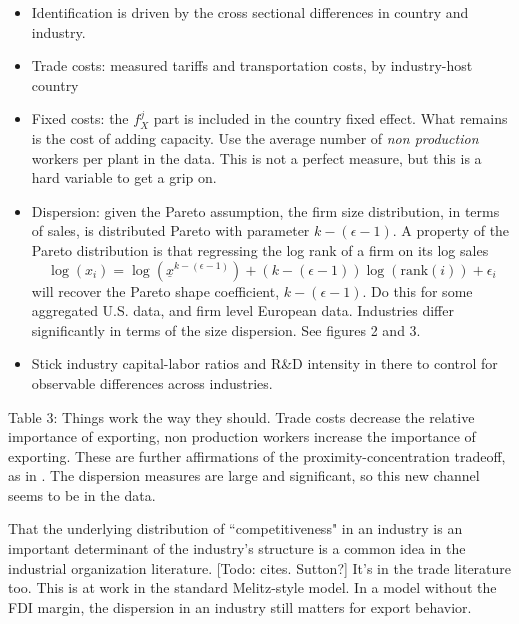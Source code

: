 \documentclass[11pt, pdftex]{article}
\begin{document}
\begin{itemize}
    \item Identification is driven by the cross sectional differences in country and industry.
  \item Trade costs: measured tariffs and transportation costs, by industry-host country
  \item Fixed costs: the $f_X^j$ part is included in the country fixed effect. What remains is the cost of adding capacity.  Use the average number of \textit{non production} workers per plant in the data.  This is not a perfect measure, but this is a hard variable to get a grip on.
  \item Dispersion: given the Pareto assumption, the firm size distribution, in terms of sales, is distributed Pareto with parameter $k-(\epsilon-1)$. A property of the Pareto distribution is that regressing the log rank of a firm on its log sales
      \[
      \log(x_i) = \log(\underline{x}^{k-(\epsilon-1)}) + (k-(\epsilon-1)) \log( \text{rank}(i) ) + \epsilon_i
      \]
      will recover the Pareto shape coefficient, $k-(\epsilon-1)$. Do this for some aggregated U.S. data, and firm level European data. Industries differ significantly in terms of the size dispersion.  See figures 2 and 3.
  \item Stick industry capital-labor ratios and R\&D intensity in there to control for observable differences across industries.
\end{itemize}

Table 3: Things work the way they should.  Trade costs decrease the relative importance of exporting, non production workers increase the importance of exporting. These are further affirmations of the proximity-concentration tradeoff, as in \citet{B97}.  The dispersion measures are large and significant, so this new channel seems to be in the data.

That the underlying distribution of ``competitiveness" in an industry is an important determinant of the industry's structure is a common idea in the industrial organization literature.  [Todo: cites. Sutton?] It's in the trade literature too.  This is at work in the standard Melitz-style model.  In a model without the FDI margin, the dispersion in an industry still matters for export behavior.

\newpage
{}
\setlength{\parskip}{0.0cm}
\printbibliography
\end{document}
